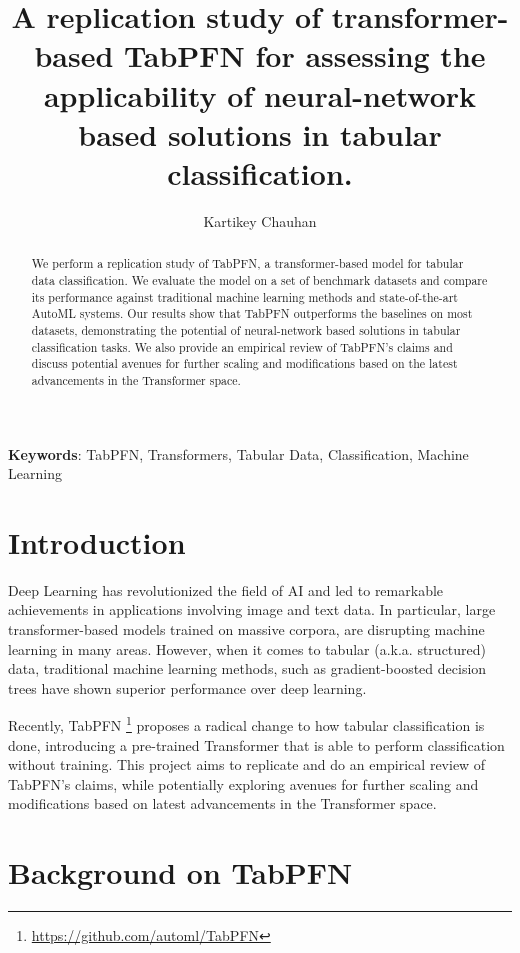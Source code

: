 \documentclass[a4paper]{article}
\title{A replication study of transformer-based TabPFN for assessing the applicability of neural-network based solutions in tabular classification.}
\author[1]{Kartikey Chauhan}
\affil[1]{\small Data Science \& Analytics, Toronto Metropolitan University}
\date{}  %
\begin{document}
\maketitle

\begin{abstract}
We perform a replication study of TabPFN, a transformer-based model for tabular data classification. We evaluate the model on a set of benchmark datasets and compare its performance against traditional machine learning methods and state-of-the-art AutoML systems. Our results show that TabPFN outperforms the baselines on most datasets, demonstrating the potential of neural-network based solutions in tabular classification tasks. We also provide an empirical review of TabPFN's claims and discuss potential avenues for further scaling and modifications based on the latest advancements in the Transformer space.

\end{abstract}

\textbf{Keywords}: TabPFN, Transformers, Tabular Data, Classification, Machine Learning

\section{Introduction}

Deep Learning has revolutionized the field of AI and led to remarkable achievements in applications involving image and text data. In particular, large transformer-based models trained on massive corpora, are disrupting machine learning in many areas. However, when it comes to tabular (a.k.a. structured) data, traditional machine learning methods, such as gradient-boosted decision trees have shown superior performance over deep learning. 

Recently, TabPFN \cite{hollmann2023tabpfn} \footnote{\url{https://github.com/automl/TabPFN}} proposes a radical change to how tabular classification is done, introducing a pre-trained Transformer that is able to perform classification without training. This project aims to replicate and do an empirical review of TabPFN's claims, while potentially exploring avenues for further scaling and modifications based on latest advancements in the Transformer space.

\section{Background on TabPFN}\label{sec2}
\end{document}
